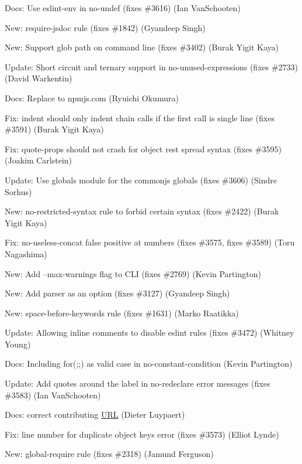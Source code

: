 \begin{DoxyItemize}
\item Docs\+: Use eslint-\/env in no-\/undef (fixes \#3616) (Ian Van\+Schooten)
\item New\+: {\ttfamily require-\/jsdoc} rule (fixes \#1842) (Gyandeep Singh)
\item New\+: Support glob path on command line (fixes \#3402) (Burak Yigit Kaya)
\item Update\+: Short circuit and ternary support in no-\/unused-\/expressions (fixes \#2733) (David Warkentin)
\item Docs\+: Replace to npmjs.\+com (Ryuichi Okumura)
\item Fix\+: {\ttfamily indent} should only indent chain calls if the first call is single line (fixes \#3591) (Burak Yigit Kaya)
\item Fix\+: {\ttfamily quote-\/props} should not crash for object rest spread syntax (fixes \#3595) (Joakim Carlstein)
\item Update\+: Use {\ttfamily globals} module for the {\ttfamily commonjs} globals (fixes \#3606) (Sindre Sorhus)
\item New\+: {\ttfamily no-\/restricted-\/syntax} rule to forbid certain syntax (fixes \#2422) (Burak Yigit Kaya)
\item Fix\+: {\ttfamily no-\/useless-\/concat} false positive at numbers (fixes \#3575, fixes \#3589) (Toru Nagashima)
\item New\+: Add --max-\/warnings flag to C\+LI (fixes \#2769) (Kevin Partington)
\item New\+: Add {\ttfamily parser} as an option (fixes \#3127) (Gyandeep Singh)
\item New\+: {\ttfamily space-\/before-\/keywords} rule (fixes \#1631) (Marko Raatikka)
\item Update\+: Allowing inline comments to disable eslint rules (fixes \#3472) (Whitney Young)
\item Docs\+: Including for(;;) as valid case in no-\/constant-\/condition (Kevin Partington)
\item Update\+: Add quotes around the label in {\ttfamily no-\/redeclare} error messages (fixes \#3583) (Ian Van\+Schooten)
\item Docs\+: correct contributing \mbox{\hyperlink{namespace_u_r_l}{U\+RL}} (Dieter Luypaert)
\item Fix\+: line number for duplicate object keys error (fixes \#3573) (Elliot Lynde)
\item New\+: global-\/require rule (fixes \#2318) (Jamund Ferguson)
\end{DoxyItemize}

